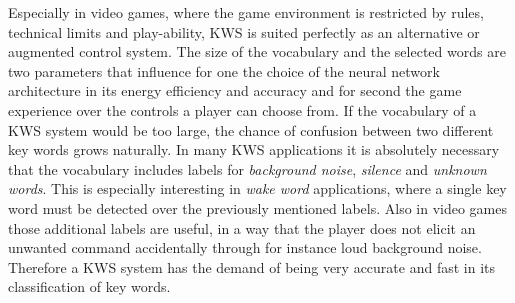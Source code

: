 Especially in video games, where the game environment is restricted by rules, technical limits and play-ability, KWS is suited perfectly as an alternative or augmented control system.
The size of the vocabulary and the selected words are two parameters that influence for one the choice of the neural network architecture in its energy efficiency and accuracy and for second the game experience over the controls a player can choose from.
If the vocabulary of a KWS system would be too large, the chance of confusion between two different key words grows naturally.
In many KWS applications it is absolutely necessary that the vocabulary includes labels for \emph{background noise}, \emph{silence} and \emph{unknown words}. 
This is especially interesting in \emph{wake word} applications, where a single key word must be detected over the previously mentioned labels.
Also in video games those additional labels are useful, in a way that the player does not elicit an unwanted command accidentally through for instance loud background noise.
Therefore a KWS system has the demand of being very accurate and fast in its classification of key words.



